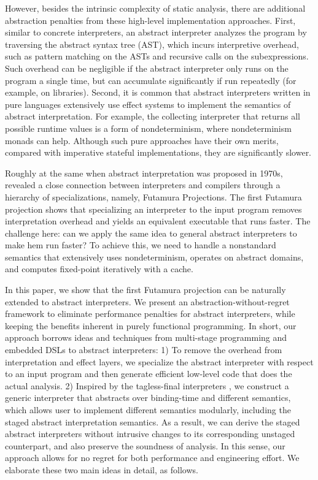 However, besides the intrinsic complexity of static analysis, there
are additional abstraction penalties from these high-level
implementation approaches. First, similar to concrete interpreters,
an abstract interpreter analyzes the program by traversing the
abstract syntax tree (AST), which incurs interpretive overhead, such
as pattern matching on the ASTs and recursive calls on the
subexpressions.
Such overhead can be negligible if the abstract interpreter only runs
on the program a single time, but can accumulate significantly if
run repeatedly (for example, on libraries).  Second, it is common that
abstract interpreters written in pure languages extensively use effect
systems to implement the semantics of abstract interpretation. For
example, the collecting interpreter that returns all possible runtime
values is a form of nondeterminism, where nondeterminism monads can
help.  Although such pure approaches have their own merits, compared
with imperative stateful implementations, they are significantly
slower.

Roughly at the same when abstract interpretation was proposed in
1970s, \citet{futamura1971partial, Futamura1999} revealed a close
connection between interpreters and compilers through a hierarchy of
specializations, namely, Futamura Projections. The first Futamura
projection shows that specializing an interpreter to the input program
removes interpretation overhead and yields an equivalent executable
that runs faster.  The challenge here: can we apply the same idea to
general abstract interpreters to make hem run faster?
To achieve this, we need to handle a nonstandard semantics that
extensively uses nondeterminism, operates on abstract domains, and
computes fixed-point iteratively with a cache.

In this paper, we show that the first Futamura projection can be naturally
extended to abstract interpreters. We present an abstraction-without-regret
framework to eliminate performance penalties for abstract interpreters, while
keeping the benefits inherent in purely functional programming. In short, our
approach borrows ideas and techniques from multi-stage programming and embedded
DSLs to abstract interpreters:  1) To remove the overhead from interpretation
and effect layers, we specialize the abstract interpreter with respect to an
input program and then generate efficient low-level code that does the actual
analysis.  2) Inspired by the tagless-final interpreters
\cite{DBLP:journals/jfp/CaretteKS09}, we construct a generic interpreter that
abstracts over binding-time and different semantics, which allows user to
implement different semantics modularly, including the staged abstract
interpretation semantics. As a result, we can derive the staged abstract
interpreters without intrusive changes to its corresponding unstaged
counterpart, and also preserve the soundness of analysis. In this sense, our
approach allows for no regret for both performance and engineering effort. We
elaborate these two main ideas in detail, as follows.

